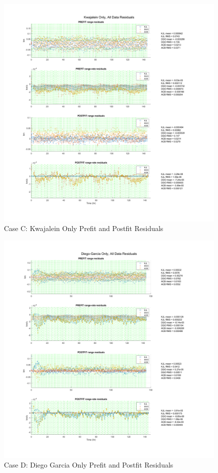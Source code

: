 \documentclass[conf]{new-aiaa}
\begin{document}
\begin{figure}[H]
\centering
\includegraphics[width=\textwidth]{caseC_res.png}
\caption{Case C: Kwajalein Only Prefit and Postfit Residuals}
\end{figure}

\begin{figure}[H]
\centering
\includegraphics[width=\textwidth]{caseD_res.png}
\caption{Case D: Diego Garcia Only Prefit and Postfit Residuals}
\end{figure}
\end{document}
